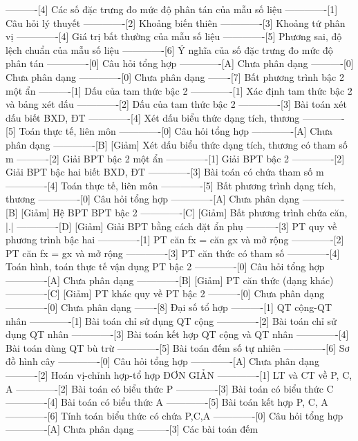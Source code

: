 ----------[4] Các số đặc trưng đo mức độ phân tán của mẫu số liệu
-------------[1] Câu hỏi lý thuyết
-------------[2] Khoảng biến thiên
-------------[3] Khoảng tứ phân vị
-------------[4] Giá trị bất thường của mẫu số liệu
-------------[5] Phương sai, độ lệch chuẩn của mẫu số liệu
-------------[6] Ý nghĩa của số đặc trưng đo mức độ phân tán
-------------[0] Câu hỏi tổng hợp
-------------[A] Chưa phân dạng
----------[0] Chưa phân dạng
-------------[0] Chưa phân dạng
-------[7] Bất phương trình bậc 2 một ẩn
----------[1] Dấu của tam thức bậc 2
-------------[1] Xác định tam thức bậc 2 và bảng xét dấu
-------------[2] Dấu của tam thức bậc 2
-------------[3] Bài toán xét dấu biết BXD, ĐT
-------------[4] Xét dấu biểu thức dạng tích, thương
-------------[5] Toán thực tế, liên môn
-------------[0] Câu hỏi tổng hợp
-------------[A] Chưa phân dạng
-------------[B] [Giảm] Xét dấu biểu thức dạng tích, thương có tham số m
----------[2] Giải BPT bậc 2 một ẩn
-------------[1] Giải BPT bậc 2
-------------[2] Giải BPT bậc hai biết BXD, ĐT
-------------[3] Bài toán có chứa tham số m
-------------[4] Toán thực tế, liên môn
-------------[5] Bất phương trình dạng tích, thương
-------------[0] Câu hỏi tổng hợp
-------------[A] Chưa phân dạng
-------------[B] [Giảm] Hệ BPT BPT bậc 2
-------------[C] [Giảm] Bất phương trình chứa căn, |.|
-------------[D] [Giảm] Giải BPT bằng cách đặt ẩn phụ
----------[3] PT quy về phương trình bậc hai
-------------[1] PT căn fx = căn gx và mở rộng
-------------[2] PT căn fx = gx và mở rộng
-------------[3] PT căn thức có tham số
-------------[4] Toán hình, toán thực tế vận dụng PT bậc 2
-------------[0] Câu hỏi tổng hợp
-------------[A] Chưa phân dạng
-------------[B] [Giảm] PT căn thức (dạng khác)
-------------[C] [Giảm] PT khác quy về PT bậc 2
----------[0] Chưa phân dạng
-------------[0] Chưa phân dạng
-------[8] Đại số tổ hợp
----------[1] QT cộng-QT nhân
-------------[1] Bài toán chỉ sử dụng QT cộng
-------------[2] Bài toán chỉ sử dụng QT nhân
-------------[3] Bài toán kết hợp QT cộng và QT nhân
-------------[4] Bài toán dùng QT bù trừ
-------------[5] Bài toán đếm số tự nhiên
-------------[6] Sơ đồ hình cây
-------------[0] Câu hỏi tổng hợp
-------------[A] Chưa phân dạng
----------[2] Hoán vị-chỉnh hợp-tổ hợp ĐƠN GIẢN
-------------[1] LT và CT về P, C, A
-------------[2] Bài toán có biểu thức P
-------------[3] Bài toán có biểu thức C
-------------[4] Bài toán có biểu thức A
-------------[5] Bài toán kết hợp P, C, A
-------------[6] Tính toán biểu thức có chứa P,C,A
-------------[0] Câu hỏi tổng hợp
-------------[A] Chưa phân dạng
----------[3] Các bài toán đếm 
